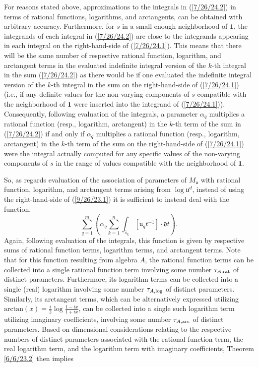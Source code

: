 \documentclass{amsart}
\numberwithin{equation}{section}
\theoremstyle{definition}
\numberwithin{theorem}{section}
\begin{document}
For reasons stated above, approximations to the integrals in (\ref{7/26/24.2}) in terms of rational functions, logarithms, and arctangents, can be obtained with arbitrary accuracy.  Furthermore, for $s$ in a small enough neighborhood of $\mathbf{1}$, the integrands of each integral in (\ref{7/26/24.2}) are close to the integrands appearing in each integral on the right-hand-side of (\ref{7/26/24.1}).  This means that there will be the same number of respective rational function, logarithm, and arctangent terms in the evaluated indefinite integral version of the $k$-th integral in the sum (\ref{7/26/24.2}) as there would be if one evaluated the indefinite integral version of the $k$-th integral in the sum on the right-hand-side of (\ref{7/26/24.1}) (i.e., if any definite values for the non-varying components of $s$ compatible with the neighborhood of $\mathbf{1}$ were inserted into the integrand of (\ref{7/26/24.1})).  Consequently, following evaluation of the integrals, a parameter $\alpha_q$ multiplies a rational function (resp., logarithm, arctangent) in the $k$-th term of the sum in (\ref{7/26/24.2}) if and only if $\alpha_q$ multiplies a rational function (resp., logarithm, arctangent) in the $k$-th term of the sum on the right-hand-side of (\ref{7/26/24.1}) were the integral actually computed for any specific values of the non-varying components of $s$ in the range of values compatible with the neighborhood of $\mathbf{1}$.  


So, as regards evaluation of the association of parameters of $M_{\mathfrak{u}}$ with rational function, logarithm, and arctangent terms arising from $\log\mathfrak{u}^d$, instead of using the right-hand-side of (\ref{9/26/23.1}) it is sufficient to instead deal with the function,
\begin{equation}\label{7/29/24.1} \sum_{q=1}^m \left(\alpha_q\sum_{k=1}^n \int_{\hat{s}_k} [\mathfrak{u}_q t^{-1}]\cdot \mathfrak{d}t\right).\end{equation} Again, following evaluation of the integrals, this function is given by respective sums of rational function terms, logarithm terms, and arctangent terms.  Note that for this function resulting from algebra $A$, the rational function terms can be collected into a single rational function term involving some number $\tau_{A,{\rm rat}}$ of distinct parameters.  Furthermore, its logarithm terms can be collected into a single (real) logarithm involving some number $\tau_{A,{\rm log}}$ of distinct parameters.  Similarly, its arctangent terms, which can be alternatively expressed utilizing $\text{arctan}(x) = \frac{i}{2}\log\frac{1-ix}{1+ix}$, can be collected into a single such logarithm term utilizing imaginary coefficients, involving some number $\tau_{A,{\rm arc}}$ of distinct parameters. 
Based on dimensional considerations relating to the respective numbers of distinct parameters associated with the rational function term, the real logarithm term, and the logarithm term with imaginary coefficients, Theorem \ref{6/6/23.2} then implies
\end{document}
